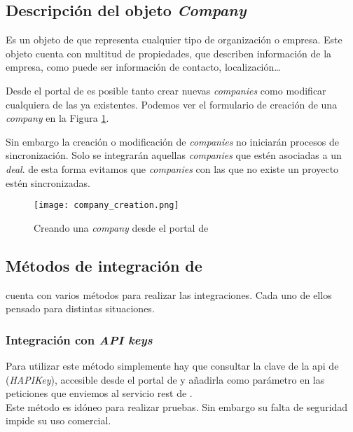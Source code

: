 \subsection{Descripción del objeto \textit{Company}}
		
		Es un objeto de \hs{} que representa cualquier tipo de organización o empresa. 
		Este objeto cuenta con multitud de propiedades, que describen información de la empresa, como puede ser información de contacto, localización\ldots 
		
		Desde el portal de \hs{} es posible tanto crear nuevas \textit{companies} como modificar cualquiera de las ya existentes. Podemos ver el formulario de creación de una \textit{company} en la Figura \ref{fig:company_creation}.
		
		Sin embargo la creación o modificación de \textit{companies} no iniciarán procesos de sincronización. Solo se integrarán aquellas \textit{companies} que estén asociadas a un \textit{deal}.
		de esta forma evitamos que \textit{companies} con las que no existe un proyecto estén sincronizadas.
		
		\begin{figure}
			\centering
			\texttt{[image: company\_creation.png]}
			\caption{Creando una \textit{company} desde el portal de \hs{}}
			\label{fig:company_creation}
		\end{figure}


\subsection{Métodos de integración de \hs{}}
\hs{} cuenta con varios métodos para realizar las integraciones. Cada uno de ellos pensado para distintas situaciones.

\subsubsection{Integración con \textit{API keys}}

Para utilizar este método simplemente hay que consultar la clave de la \acrshort{api} de \hs{} (\textit{HAPIKey}), 
accesible desde el portal de \hs{} y añadirla como parámetro en las peticiones que enviemos al servicio \acrshort{rest} de \hs{}.\\

Este método es idóneo para realizar pruebas. Sin embargo su falta de seguridad impide su uso comercial. %

